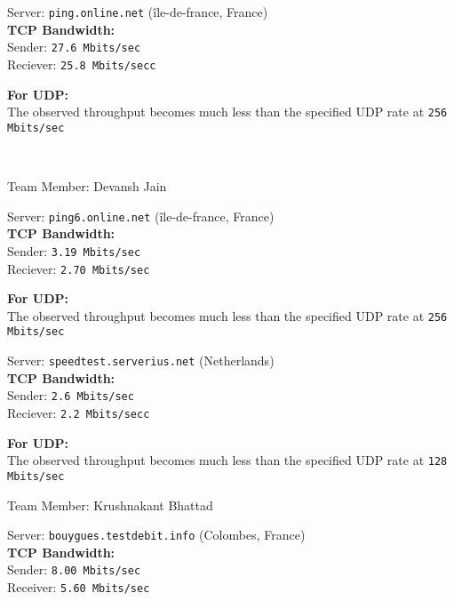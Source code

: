 \documentclass[11pt, fleqn]{article}
\begin{document}
\hrulefill
\medskip

Server: \texttt{ping.online.net} (\^{i}le-de-france, France)\\
\textbf{TCP Bandwidth:}\\
Sender: \texttt{27.6 Mbits/sec}\\
Reciever: \texttt{25.8 Mbits/secc}

\textbf{For UDP:}\\
The observed throughput becomes much less than the specified UDP rate at \texttt{256 Mbits/sec}

\hrulefill 
~\\

\medskip

Team Member: Devansh Jain

\hrulefill
\smallskip


Server: \texttt{ping6.online.net} (\^{i}le-de-france, France)\\
\textbf{TCP Bandwidth:}\\
Sender: \texttt{3.19 Mbits/sec}\\
Reciever: \texttt{2.70 Mbits/sec}

\textbf{For UDP:}\\
The observed throughput becomes much less than the specified UDP rate at \texttt{256 Mbits/sec}

\hrulefill
\medskip

Server: \texttt{speedtest.serverius.net} (Netherlands)\\
\textbf{TCP Bandwidth:}\\
Sender: \texttt{2.6 Mbits/sec}\\
Reciever: \texttt{2.2 Mbits/secc}

\textbf{For UDP:}\\
The observed throughput becomes much less than the specified UDP rate at \texttt{128 Mbits/sec}

\hrulefill


\newpage

Team Member: Krushnakant Bhattad

\hrulefill

\smallskip

Server: \texttt{bouygues.testdebit.info} (Colombes, France)\\
\textbf{TCP Bandwidth:}\\
Sender: \texttt{8.00 Mbits/sec}\\
Receiver: \texttt{5.60 Mbits/sec}
\end{document}
